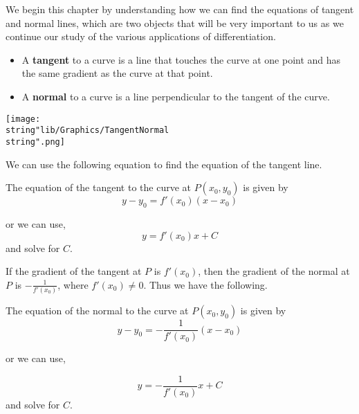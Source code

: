 \documentclass[11pt,a4paper]{book}
\begin{document}
\begin{minipage}[t]{0.5\textwidth}

We begin this chapter by understanding how we can find the equations
of tangent and normal lines, which are two objects that will be very
important to us as we continue our study of the various applications
of differentiation.

\begin{itemize}

\item A \textbf{tangent} to a curve is a line that touches the curve
at one point and has the same gradient as the curve at that point.

\item A \textbf{normal} to a curve is a line perpendicular to the
tangent of the curve.

\end{itemize}

\end{minipage}
\begin{minipage}[t]{0.5\textwidth}
\begin{center}
\texttt{[image: \\string"lib/Graphics/TangentNormal\\string".png]}
\par\end{center}

\end{minipage}

We can use the following equation to find the equation of the tangent
line.

\begin{tcolorbox}[colback=blue!5, colframe=black, boxrule=.4pt, sharpish corners]

The equation of the tangent to the curve at $P\left(x_{0},y_{0}\right)$
is given by
\[
y-y_{0}=f'\left(x_{0}\right)\left(x-x_{0}\right)
\]

or we can use,
\[
y=f'\left(x_{0}\right)x+C
\]
and solve for $C$.
\end{tcolorbox}

If the gradient of the tangent at $P$ is $f'\left(x_{0}\right)$,
then the gradient of the normal at $P$ is ${\displaystyle -\frac{1}{f'\left(x_{0}\right)}}$,
where $f'\left(x_{0}\right)\neq0$. Thus we have the following.
\begin{tcolorbox}[colback=blue!5, colframe=black, boxrule=.4pt, sharpish corners]

The equation of the normal to the curve at $P\left(x_{0},y_{0}\right)$
is given by
\[
y-y_{0}=-\frac{1}{f'\left(x_{0}\right)}\left(x-x_{0}\right)
\]

or we can use,

\[
y=-\frac{1}{f'\left(x_{0}\right)}x+C
\]
and solve for $C$.
\end{tcolorbox}
\end{document}

